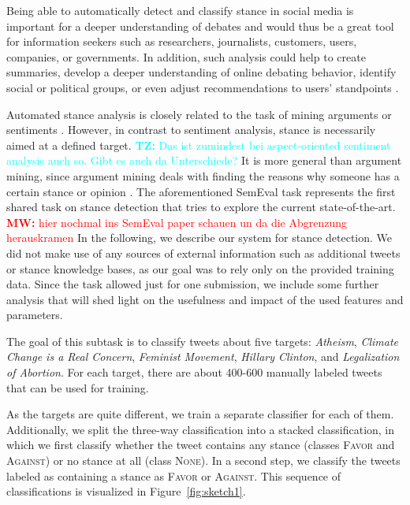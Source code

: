 \documentclass[11pt]{article}
\newcommand{\tz}[1]{\textcolor{cyan}{\textbf{TZ:} #1}}
\newcommand{\mw}[1]{\textcolor{red}{\textbf{MW:} #1}}
\newcommand{\tz}[1]{}
\newcommand{\mw}[1]{}
\begin{document}
Being able to automatically detect and classify stance in social media is important for a deeper understanding of debates and would thus be a great tool for information seekers such as researchers, journalists, customers, users, companies, or governments.
In addition, such analysis could help to create summaries, develop a deeper understanding of online debating behavior, identify social or political groups, or even adjust recommendations to users' standpoints \cite{anand2011cats,sridhar2014collective,boltuzic2014back}.

Automated stance analysis is closely related to the task of mining arguments or sentiments \cite{boltuzic2014back}.
However, in contrast to sentiment analysis, stance is necessarily aimed at a defined target. \tz{Das ist zumindest bei aspect-oriented sentiment analysis auch so. Gibt es auch da Unterschiede?}
It is more general than argument mining, since argument mining deals with finding the reasons why someone has a certain stance or opinion \cite{boltuzic2014back}.
The aforementioned \mbox{SemEval} task represents the first shared task on stance detection that tries to explore the current state-of-the-art.
\mw{hier nochmal ins SemEval paper schauen un da die Abgrenzung herauskramen}
In the following, we describe our system for stance detection.
We did not make use of any sources of external information such as additional tweets or stance knowledge bases, as our goal was to rely only on the provided training data.
Since the task allowed just for one submission, we include some further analysis that will shed light on the usefulness and impact of the used features and parameters.

\label{sec:SubtaskA}
The goal of this subtask is to classify tweets about five targets: \textit{Atheism}, \textit{Climate Change is a Real Concern}, \textit{Feminist Movement}, \textit{Hillary Clinton}, and \textit{Legalization of Abortion}.
For each target, there are about 400-600 manually labeled tweets that can be used for training.

As the targets are quite different, we train a separate classifier for each of them. 
Additionally, we split the three-way classification into a stacked classification, in which we first classify whether the tweet contains any stance (classes \textsc{Favor} and \textsc{Against}) or no stance at all (class \textsc{None}).
In a second step, we classify the tweets labeled as containing a stance as \textsc{Favor} or \textsc{Against}.
This sequence of classifications is visualized in Figure~\ref{fig:sketch1}.
\end{document}
